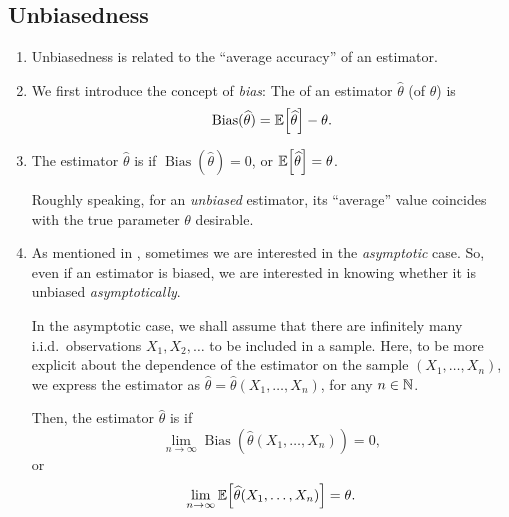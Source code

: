 \subsection{Unbiasedness}
\begin{enumerate}
\item Unbiasedness is related to the ``average accuracy'' of an estimator.
\item We first introduce the concept of \emph{bias}: The  of an
estimator \(\widehat{\theta}\) (of \(\theta\)) is
\[
\operatorname{Bias}(\widehat{\theta})=\mathbb{E}\qty[\widehat{\theta}]-\theta.
\]
\item The estimator \(\widehat{\theta}\) is  if
\(\operatorname{Bias}(\widehat{\theta})=0\), or
\(\mathbb{E}\qty[\widehat{\theta}]=\theta\).

\begin{note}
Roughly speaking, for an \emph{unbiased} estimator, its ``average'' value
coincides with the true parameter \(\theta\)  desirable.
\end{note}

\item As mentioned in , sometimes we are
interested in the \emph{asymptotic} case. So, even if an estimator is biased,
we are interested in knowing whether it is unbiased \emph{asymptotically}.

In the asymptotic case, we shall assume that there are infinitely many i.i.d.\
observations \(X_1,X_2,\dotsc\) to be included in a sample. Here, to be more
explicit about the dependence of the estimator on the sample
\((X_1,\dotsc,X_n)\), we express the estimator as
\(\widehat{\theta}=\widehat{\theta}(X_1,\dotsc,X_n)\), for any \(n\in\mathbb{N}\).

Then, the estimator \(\widehat{\theta}\) is  if
\[
\lim_{n\to \infty}\operatorname{Bias}(\widehat{\theta}(X_1,\dotsc,X_n))=0,
\]
or
\[
\lim_{n\to \infty}\mathbb{E}\qty[\widehat{\theta}(X_1,\dotsc,X_n)]=\theta.
\]
\end{enumerate}
